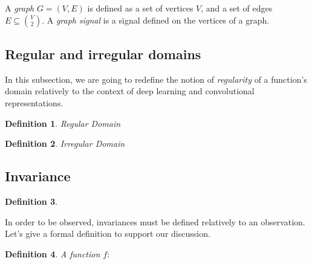 \documentclass{article}
\newtheorem{definition}{Definition}
\begin{document}
A \emph{graph} $G = (V, E)$ is defined as a set of vertices $V$, and a set of edges $E \subseteq\binom{V}{2}$.
A \emph{graph signal} is a signal defined on the vertices of a graph.


\subsection*{Regular and irregular domains}

In this subsection, we are going to redefine the notion of \emph{regularity} of a function's domain relatively to the context of deep learning and convolutional representations.



\begin{definition}{Regular Domain}\\
\end{definition}


\begin{definition}{Irregular Domain}\\

\end{definition}


\subsection*{Invariance}

\begin{definition}

\end{definition}

In order to be observed, invariances must be defined relatively to an observation. Let's give a formal definition to support our discussion.



\begin{definition}{A function $f: $}

\end{definition}
\end{document}
